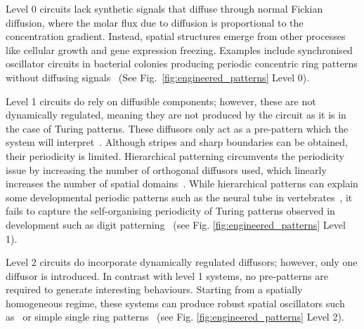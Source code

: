 Level 0 circuits lack synthetic signals that diffuse through normal Fickian diffusion, where the molar flux due to diffusion is proportional to the concentration gradient.
Instead, spatial structures emerge from other processes like cellular growth and gene expression freezing.
Examples include synchronised oscillator circuits in bacterial colonies producing periodic concentric ring patterns without diffusing signals~\parencite{Potvin-Trottier2016, Riglar2019} (See Fig.~\ref{fig:engineered_patterns} Level 0).

Level 1 circuits do rely on diffusible components; however, these are not dynamically regulated, meaning they are not produced by the circuit as it is in the case of Turing patterns.
These diffusors only act as a pre-pattern which the system will interpret~\parencite{Basu2005, Schaerli2014, Kong2017, Barbier2020, Grant2020}.
Although stripes and sharp boundaries can be obtained, their periodicity is limited.
Hierarchical patterning circumvents the periodicity issue by increasing the number of orthogonal diffusors used, which linearly increases the number of spatial domains~\parencite{Boehm2018}.
While hierarchical patterns can explain some developmental periodic patterns such as the neural tube in vertebrates~\parencite{Briscoe2015}, it fails to capture the self-organising periodicity of Turing patterns observed in development such as digit patterning~\parencite{Sheth2012,Raspopovic1} (see Fig. \ref{fig:engineered_patterns} Level 1).

Level 2 circuits do incorporate dynamically regulated diffusors; however, only one diffusor is introduced.
In contrast with level 1 systems, no pre-patterns are required to generate interesting behaviours.
Starting from a spatially homogeneous regime, these systems can produce robust spatial oscillators such as~\parencite{Danino2010} or simple single ring patterns~\parencite{Cao2016, Payne2013} (see Fig. \ref{fig:engineered_patterns} Level 2).

